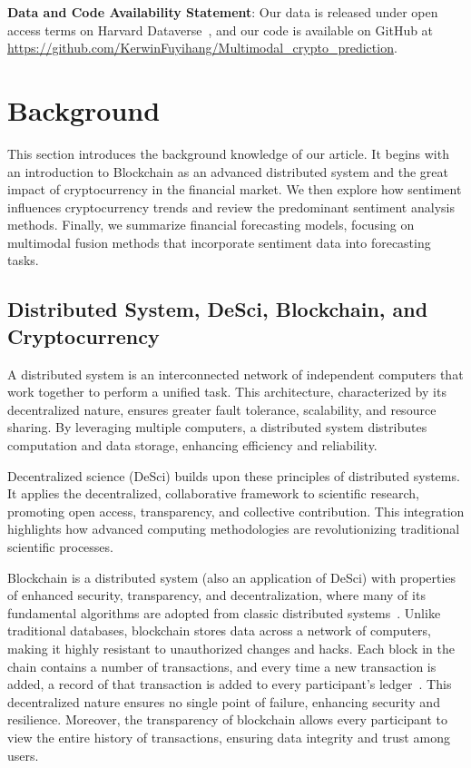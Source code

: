 \textbf{Data and Code Availability Statement}: Our data is released under open access terms on Harvard Dataverse~\cite{DVN/HWBT53_2024}, and our code is available on GitHub at \url{https://github.com/KerwinFuyihang/Multimodal_crypto_prediction}.

\section{Background}
\label{Related Work}
This section introduces the background knowledge of our article. It begins with an introduction to Blockchain as an advanced distributed system and the great impact of cryptocurrency in the financial market. We then explore how sentiment influences cryptocurrency trends and review the predominant sentiment analysis methods. Finally, we summarize financial forecasting models, focusing on multimodal fusion methods that incorporate sentiment data into forecasting tasks.
\subsection{Distributed System, DeSci, Blockchain, and Cryptocurrency}
A distributed system is an interconnected network of independent computers that work together to perform a unified task. This architecture, characterized by its decentralized nature, ensures greater fault tolerance, scalability, and resource sharing. By leveraging multiple computers, a distributed system distributes computation and data storage, enhancing efficiency and reliability.

Decentralized science (DeSci) builds upon these principles of distributed systems. It applies the decentralized, collaborative framework to scientific research, promoting open access, transparency, and collective contribution. This integration highlights how advanced computing methodologies are revolutionizing traditional scientific processes.

Blockchain is a distributed system (also an application of DeSci) with properties of enhanced security, transparency, and decentralization, where many of its fundamental algorithms are adopted from classic distributed systems~\cite{herlihy2019blockchains}. Unlike traditional databases, blockchain stores data across a network of computers, making it highly resistant to unauthorized changes and hacks. Each block in the chain contains a number of transactions, and every time a new transaction is added, a record of that transaction is added to every participant's ledger~\cite{hashemi2020cryptocurrency}. This decentralized nature ensures no single point of failure, enhancing security and resilience. Moreover, the transparency of blockchain allows every participant to view the entire history of transactions, ensuring data integrity and trust among users.

